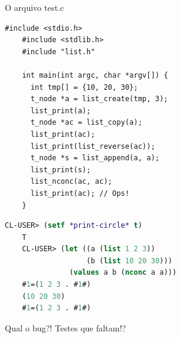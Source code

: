 \documentclass{beamer}
\begin{document}
\begin{frame}{O arquivo test.c}

  \begin{lstlisting}[style=normalc, caption=list/list-test.c]
    #include <stdio.h>
    #include <stdlib.h>
    #include "list.h"
    
    int main(int argc, char *argv[]) {
      int tmp[] = {10, 20, 30};
      t_node *a = list_create(tmp, 3);
      list_print(a);
      t_node *ac = list_copy(a);
      list_print(ac);
      list_print(list_reverse(ac));
      t_node *s = list_append(a, a); 
      list_print(s);
      list_nconc(ac, ac);
      list_print(ac); // Ops!
    }
  \end{lstlisting}

  \framebreak

  \begin{lstlisting}[style=code,language=lisp]
    CL-USER> (setf *print-circle* t)
    T
    CL-USER> (let ((a (list 1 2 3))
                   (b (list 10 20 30)))
               (values a b (nconc a a)))
    #1=(1 2 3 . #1#)
    (10 20 30)
    #1=(1 2 3 . #1#)
  \end{lstlisting}

  Qual o bug?! Testes que faltam!?
  
\end{frame}
\end{document}
